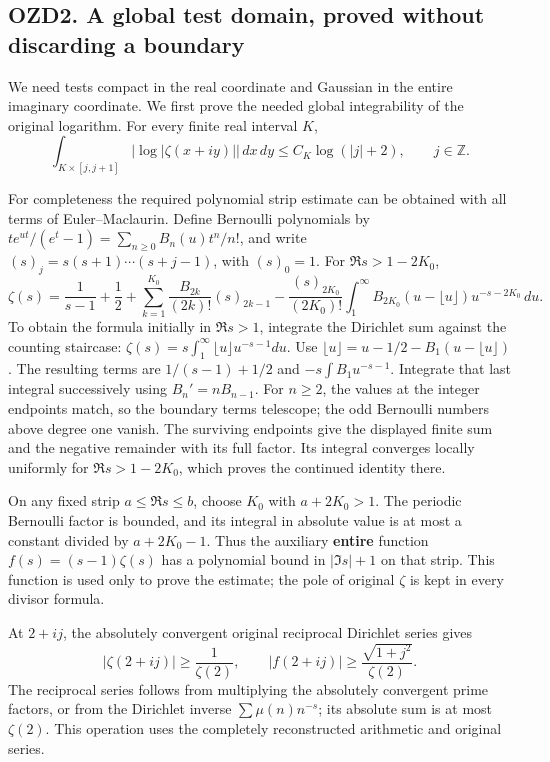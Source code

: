 \subsection{OZD2. A global test domain, proved without discarding a
boundary}\label{ozd2.-a-global-test-domain-proved-without-discarding-a-boundary}

We need tests compact in the real coordinate and Gaussian in the entire
imaginary coordinate. We first prove the needed global integrability of
the original logarithm. For every finite real interval \(K\), \[
\int_{K\times[j,j+1]}|\log|\zeta(x+iy)||\,dx\,dy
\le C_K\log(|j|+2),\qquad j\in\mathbb Z.
\tag{OZD2.1}
\]

For completeness the required polynomial strip estimate can be obtained
with all terms of Euler--Maclaurin. Define Bernoulli polynomials by
\(te^{ut}/(e^t-1)=\sum_{n\ge0}B_n(u)t^n/n!\), and write
\((s)_j=s(s+1)\cdots(s+j-1)\), with \((s)_0=1\). For \(\Re s>1-2K_0\),
\[
\zeta(s)=\frac1{s-1}+\frac12
+\sum_{k=1}^{K_0}\frac{B_{2k}}{(2k)!}(s)_{2k-1}
-\frac{(s)_{2K_0}}{(2K_0)!}
\int_1^\infty B_{2K_0}(u-\lfloor u\rfloor)u^{-s-2K_0}\,du.
\tag{OZD2.2}
\] To obtain the formula initially in \(\Re s>1\), integrate the
Dirichlet sum against the counting staircase:
\(\zeta(s)=s\int_1^\infty\lfloor u\rfloor u^{-s-1}du\). Use
\(\lfloor u\rfloor=u-1/2-B_1(u-\lfloor u\rfloor)\). The resulting terms
are \(1/(s-1)+1/2\) and \(-s\int B_1u^{-s-1}\). Integrate that last
integral successively using \(B_n'=nB_{n-1}\). For \(n\ge2\), the values
at the integer endpoints match, so the boundary terms telescope; the odd
Bernoulli numbers above degree one vanish. The surviving endpoints give
the displayed finite sum and the negative remainder with its full
factor. Its integral converges locally uniformly for \(\Re s>1-2K_0\),
which proves the continued identity there.

On any fixed strip \(a\le\Re s\le b\), choose \(K_0\) with \(a+2K_0>1\).
The periodic Bernoulli factor is bounded, and its integral in absolute
value is at most a constant divided by \(a+2K_0-1\). Thus the auxiliary
\textbf{entire} function \(f(s)=(s-1)\zeta(s)\) has a polynomial bound
in \(|\Im s|+1\) on that strip. This function is used only to prove the
estimate; the pole of original \(\zeta\) is kept in every divisor
formula.

At \(2+ij\), the absolutely convergent original reciprocal Dirichlet
series gives \[
|\zeta(2+ij)|\ge\frac1{\zeta(2)},\qquad
|f(2+ij)|\ge\frac{\sqrt{1+j^2}}{\zeta(2)}.
\tag{OZD2.3}
\] The reciprocal series follows from multiplying the absolutely
convergent prime factors, or from the Dirichlet inverse
\(\sum\mu(n)n^{-s}\); its absolute sum is at most \(\zeta(2)\). This
operation uses the completely reconstructed arithmetic and original
series.

